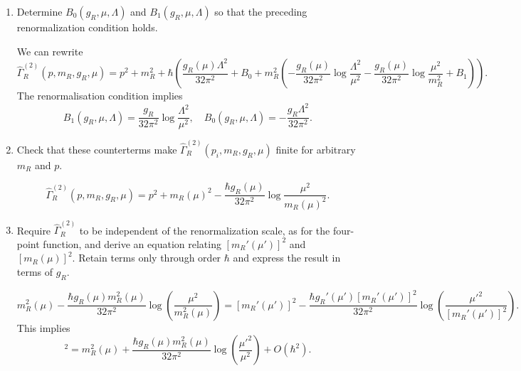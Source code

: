 \begin{enumerate}[label=\alph*), resume]
    \item Determine $B_0(g_R,\mu,\Lambda)$ and
    $B_1(g_R,\mu,\Lambda)$ so that the preceding renormalization condition holds.
    \begin{solution}
        We can rewrite
        \begin{equation}
            \widehat\Gamma_R^{(2)}(p,m_R,g_R,\mu) = p^2 + m_R^2 + \hbar\left(\frac{g_R(\mu)\Lambda^2}{32\pi^2} + B_0 + m_R^2\left(-\frac{g_R(\mu)}{32\pi^2}\log\frac{\Lambda^2}{\mu^2} - \frac{g_R(\mu)}{32\pi^2}\log\frac{\mu^2}{m_R^2}+B_1\right)\right).
        \end{equation}
        The renormalisation condition implies
        \begin{equation}
             B_1(g_R,\mu,\Lambda) = \frac{g_R}{32\pi^2}\log\frac{\Lambda^2}{\mu^2} , \quad B_0(g_R,\mu,\Lambda) = -\frac{g_R\Lambda^2}{32\pi^2}.
        \end{equation}
    \end{solution}

    \item Check that these counterterms make
    $\widehat\Gamma_R^{(2)}(p_i,m_R,g_R,\mu)$ finite for arbitrary $m_R$ and $p$.
    \begin{solution}
        \begin{equation}
            \widehat\Gamma_R^{(2)}(p,m_R,g_R,\mu) = p^2 + m_R(\mu)^2 -\frac{\hbar g_R(\mu)}{32\pi^2}\log\frac{\mu^2}{m_R(\mu)^2}.
        \end{equation}
    \end{solution}

    \item Require $\widehat\Gamma_R^{(2)}$ to be independent of the
    renormalization scale, as for the four-point function, and derive an equation
    relating $[m_R'(\mu')]^2$ and $[m_R(\mu)]^2$. Retain terms only through
    order $\hbar$ and express the result in terms of $g_R$.
    \begin{solution}
        \begin{equation}
                    m_R^2(\mu)
        -
        \frac{\hbar g_R(\mu)m_R^2(\mu)}{32\pi^2}
        \log\left(\frac{\mu^2}{m_R^2(\mu)}\right)
        =
        [m_R'(\mu')]^2
        -
        \frac{\hbar g_R'(\mu')[m_R'(\mu')]^2}{32\pi^2}
        \log\left(\frac{\mu'^2}{[m_R'(\mu')]^2}\right).
        \end{equation}
                This implies
                \begin{equation}
                            [m_R'(\mu')]^2
=
m_R^2(\mu)
+
\frac{\hbar g_R(\mu)m_R^2(\mu)}{32\pi^2}
\log\left(\frac{\mu'^2}{\mu^2}\right)
+O(\hbar^2).
                \end{equation}
    \end{solution}


\end{enumerate}
